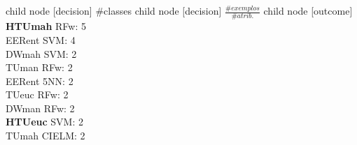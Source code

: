 child {node [decision] {\#classes}
child {node [decision] {$\frac{\#exemplos}{\#atrib.}$}
child {node [outcome] {
\textbf{HTUmah} RFw: 5\\
EERent SVM: 4\\
DWmah SVM: 2\\
TUman RFw: 2\\
EERent 5NN: 2\\
TUeuc RFw: 2\\
DWman RFw: 2\\
\textbf{HTUeuc} SVM: 2\\
TUmah CIELM: 2\\
}}}}
